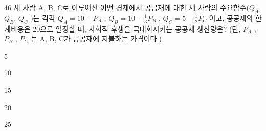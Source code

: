 \begin{question}{46}
세 사람 A, B, C로 이루어진 어떤 경제에서 공공재에 대한 세 사람의 수요함수($Q_{ A }$, $Q_{ B }$, $Q_{ C }$ )는 각각 $Q_{ A } =10-P_{ A }$ , $Q_{ B } =10- \frac{ 1 } { 3 } P_{ B }$ , $Q_{ C } =5- \frac{ 1 } { 2 } P_{ C }$ 이고, 공공재의 한계비용은 20으로 일정할 때, 사회적 후생을 극대화시키는 공공재 생산량은? (단, $P_{ A }$ , $P_{ B }$ , $P_{ C }$ 는 A, B, C가 공공재에 지불하는 가격이다.)
\begin{choices}
  \item 5
  \item 10
  \item 15
  \item 20
  \item 25
\end{choices}
\end{question}
